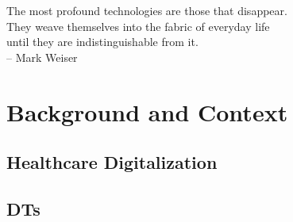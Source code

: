 \documentclass[12pt,a4paper,openright,twoside]{book}
\begin{document}
\glsresetall

\begin{dedication} %
The most profound technologies are those that disappear.
\\
They weave themselves into the fabric of everyday life
\\
until they are indistinguishable from it.
\\
\vspace{1em}
-- Mark Weiser
\end{dedication}



\tableofcontents   
\listoffigures     %
\lstlistoflistings %

\mainmatter

\label{chap:introduction}


\glsresetall

\part{Background and Context}
\label{part:background}

\chapter{Healthcare Digitalization}
\label{chap:back:health4.0}



\chapter{\aclp{DT}}
\label{chap:back:DT}
\end{document}
